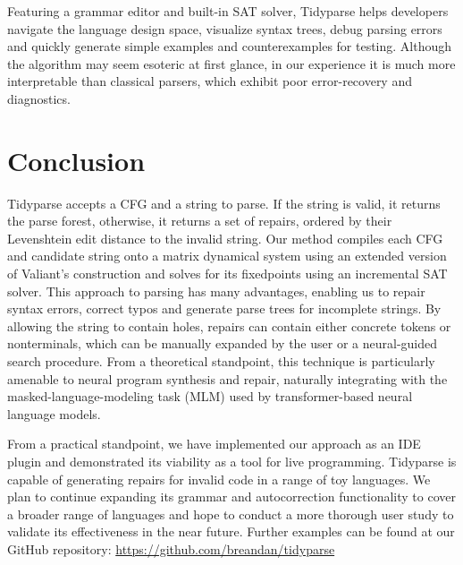 \documentclass[sigplan,review,anonymous,acmsmall]{acmart}\settopmatter{printfolios=false,printccs=false,printacmref=false}
\begin{document}
    Featuring a grammar editor and built-in SAT solver, Tidyparse helps developers navigate the language design space, visualize syntax trees, debug parsing errors and quickly generate simple examples and counterexamples for testing. Although the algorithm may seem esoteric at first glance, in our experience it is much more interpretable than classical parsers, which exhibit poor error-recovery and diagnostics.

    \section{Conclusion}

    Tidyparse accepts a CFG and a string to parse. If the string is valid, it returns the parse forest, otherwise, it returns a set of repairs, ordered by their Levenshtein edit distance to the invalid string. Our method compiles each CFG and candidate string onto a matrix dynamical system using an extended version of Valiant's construction and solves for its fixedpoints using an incremental SAT solver. This approach to parsing has many advantages, enabling us to repair syntax errors, correct typos and generate parse trees for incomplete strings. By allowing the string to contain holes, repairs can contain either concrete tokens or nonterminals, which can be manually expanded by the user or a neural-guided search procedure. From a theoretical standpoint, this technique is particularly amenable to neural program synthesis and repair, naturally integrating with the masked-language-modeling task (MLM) used by transformer-based neural language models.

    From a practical standpoint, we have implemented our approach as an IDE plugin and demonstrated its viability as a tool for live programming. Tidyparse is capable of generating repairs for invalid code in a range of toy languages. We plan to continue expanding its grammar and autocorrection functionality to cover a broader range of languages and hope to conduct a more thorough user study to validate its effectiveness in the near future. Further examples can be found at our GitHub repository: \url{https://github.com/breandan/tidyparse}
\end{document}
